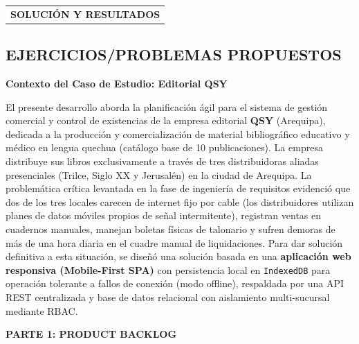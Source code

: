 \vspace{0.8em}
\noindent
{\renewcommand{\arraystretch}{1.0}
\begin{tabularx}{\linewidth}{|>{\centering\arraybackslash}X|}
    \hline
    \rowcolor{tablebackground}
    \textbf{\large\color{white} SOLUCIÓN Y RESULTADOS} \\
\end{tabularx}
}

\vspace{-1.5em}
\subsection{EJERCICIOS/PROBLEMAS PROPUESTOS}

\noindent\textbf{\color{mauve} Contexto del Caso de Estudio: Editorial QSY}\par
\noindent El presente desarrollo aborda la planificación ágil para el sistema de gestión comercial y control de existencias de la empresa editorial \textbf{QSY} (Arequipa), dedicada a la producción y comercialización de material bibliográfico educativo y médico en lengua quechua (catálogo base de 10 publicaciones). La empresa distribuye sus libros exclusivamente a través de tres distribuidoras aliadas presenciales (Trilce, Siglo XX y Jerusalén) en la ciudad de Arequipa. La problemática crítica levantada en la fase de ingeniería de requisitos evidenció que dos de los tres locales carecen de internet fijo por cable (los distribuidores utilizan planes de datos móviles propios de señal intermitente), registran ventas en cuadernos manuales, manejan boletas físicas de talonario y sufren demoras de más de una hora diaria en el cuadre manual de liquidaciones. Para dar solución definitiva a esta situación, se diseñó una solución basada en una \textbf{aplicación web responsiva (Mobile-First SPA)} con persistencia local en \texttt{IndexedDB} para operación tolerante a fallos de conexión (modo offline), respaldada por una API REST centralizada y base de datos relacional con aislamiento multi-sucursal mediante RBAC.

\vspace{1em}
\noindent\textbf{\large PARTE 1: PRODUCT BACKLOG}

